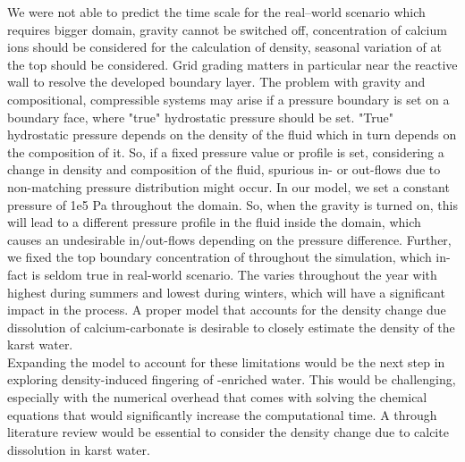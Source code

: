 We were not able to predict the time scale for the real–world scenario which requires bigger domain, gravity cannot be switched off, concentration of calcium ions should be considered for the calculation of density, seasonal variation of  at the top should be considered. Grid grading matters in particular near the reactive wall to resolve the developed boundary layer. The problem with gravity and compositional, compressible systems may arise if a pressure boundary is set on a boundary face, where "true" hydrostatic pressure should be set. "True" hydrostatic pressure depends on the density of the fluid which in turn depends on the composition of it. So, if a fixed pressure value or profile is set, considering a change in density and composition of the fluid, spurious in- or out-flows due to non-matching pressure distribution might occur. In our \DuMuX model, we set a constant pressure of 1e5 Pa throughout the domain. So, when the gravity is turned on, this will lead to a different pressure profile in the fluid inside the domain, which causes an undesirable in/out-flows depending on the pressure difference. Further, we fixed the top boundary concentration of  throughout the simulation, which in-fact is seldom true in real-world scenario. The  varies throughout the year with highest during summers and lowest during winters, which will have a significant impact in the process. A proper model that accounts for the density change due dissolution of calcium-carbonate is desirable to closely estimate the density of the karst water.\\

Expanding the model to account for these limitations would be the next step in exploring density-induced fingering of -enriched water. This would be challenging, especially with the numerical overhead that comes with solving the chemical equations that would significantly increase the computational time. A through literature review would be essential to consider the density change due to calcite dissolution in karst water. \\


\endinput
